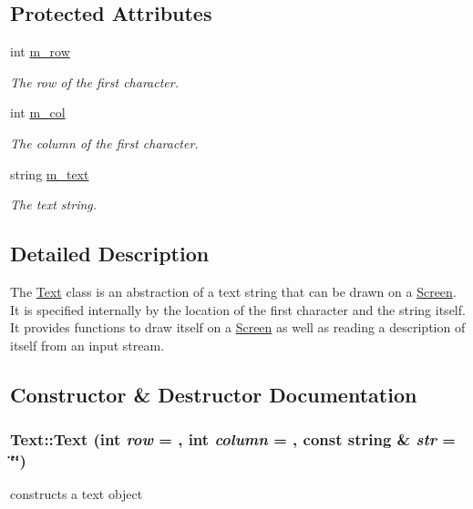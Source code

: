 \subsection*{Protected Attributes}
\begin{DoxyCompactItemize}
\item 
\hypertarget{classText_a32b3be97b9aabe0a490787c7120b371d}{
int \hyperlink{classText_a32b3be97b9aabe0a490787c7120b371d}{m\_\-row}}
\label{classText_a32b3be97b9aabe0a490787c7120b371d}

\begin{DoxyCompactList}\small\item\em The row of the first character. \item\end{DoxyCompactList}\item 
\hypertarget{classText_a09523ee86a807344c5e41db7ccc6ddf2}{
int \hyperlink{classText_a09523ee86a807344c5e41db7ccc6ddf2}{m\_\-col}}
\label{classText_a09523ee86a807344c5e41db7ccc6ddf2}

\begin{DoxyCompactList}\small\item\em The column of the first character. \item\end{DoxyCompactList}\item 
\hypertarget{classText_aead900be403332c4d7c9388e6a1be316}{
string \hyperlink{classText_aead900be403332c4d7c9388e6a1be316}{m\_\-text}}
\label{classText_aead900be403332c4d7c9388e6a1be316}

\begin{DoxyCompactList}\small\item\em The text string. \item\end{DoxyCompactList}\end{DoxyCompactItemize}


\subsection{Detailed Description}
The \hyperlink{classText}{Text} class is an abstraction of a text string that can be drawn on a \hyperlink{classScreen}{Screen}. It is specified internally by the location of the first character and the string itself. It provides functions to draw itself on a \hyperlink{classScreen}{Screen} as well as reading a description of itself from an input stream. 

\subsection{Constructor \& Destructor Documentation}
\hypertarget{classText_a1c798d677585c623ce9cd6b9d874cafe}{
\subsubsection[{Text}]{\setlength{\rightskip}{0pt plus 5cm}Text::Text (int {\em row} = {}, \/  int {\em column} = {}, \/  const string \& {\em str} = {\ttfamily \char`\"{}\char`\"{}})}}
\label{classText_a1c798d677585c623ce9cd6b9d874cafe}
constructs a text object


